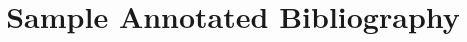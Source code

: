 \documentclass[11pt]{article}
\begin{document}
\title{Sample Annotated Bibliography}\nocite{*} %

\maketitle
\cite{yao2019kgbert}

 
\end{document}
